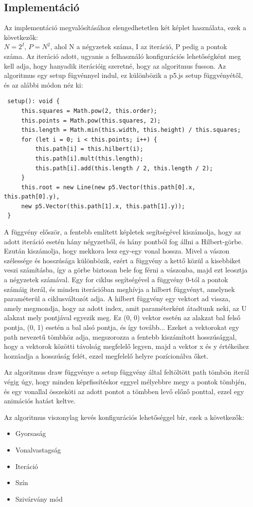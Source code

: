 \subsection*{Implementáció}
Az implementáció megvalósításához elengedhetetlen két képlet használata, ezek a következők:\\
$N = 2^I$,
$P = N^2$, ahol N a négyzetek száma, I az iteráció, P pedig a pontok száma. Az iteráció adott, ugyanis a felhasználó konfigurációs lehetőségként meg kell adja, hogy hanyadik iterációig szeretné, hogy az algoritmus fusson. 
Az algoritmus egy setup fügvénnyel indul, ez különbözik a p5.js setup függvényétől, és az alábbi módon néz ki:
\begin{lstlisting}
 setup(): void {
	 this.squares = Math.pow(2, this.order);
	 this.points = Math.pow(this.squares, 2);
	 this.length = Math.min(this.width, this.height) / this.squares;
	 for (let i = 0; i < this.points; i++) {
		 this.path[i] = this.hilbert(i);
		 this.path[i].mult(this.length);
		 this.path[i].add(this.length / 2, this.length / 2);
	 }
	 this.root = new Line(new p5.Vector(this.path[0].x, this.path[0].y),
	 new p5.Vector(this.path[1].x, this.path[1].y));
 }
\end{lstlisting}
A függvény először, a fentebb említett képletek segítségével kiszámolja, hogy az adott iteráció esetén hány négyzetből, és hány pontból fog állni a Hilbert-görbe. Ezután kiszámolja, hogy mekkora lesz egy-egy vonal hossza. Mivel a vászon szélessége és hosszúsága különbözik, ezért a függvény a kettő közül a kisebbiket veszi számításba, így a görbe biztosan bele fog férni a vászonba, majd ezt leosztja a négyzetek számával. Egy for ciklus segítségével a függvény 0-tól a pontok számáig iterál, és minden iterációban meghívja a hilbert függvényt, amelynek paraméterül a ciklusváltozót adja. A hilbert függvény egy vektort ad vissza, amely megmondja, hogy az adott index, amit paraméterként átadtunk neki, az U alakzat mely pontjával egyezik meg. Ez (0, 0) vektor esetén az alakzat bal felső pontja, (0, 1) esetén a bal alsó pontja, és így tovább... Ezeket a vektorokat egy path nevezetű tömbhöz adja, megszorozza a fentebb kiszámított hosszúsággal, hogy a vektorok közötti távolság megfelelő legyen, majd a vektor x és y értékeihez hozzáadja a hosszúság felét, ezzel megfelelő helyre pozícionálva őket.
\par Az algoritmus draw függvénye a setup függvény által feltöltött path tömbön iterál végig úgy, hogy minden képrfissítéskor eggyel mélyebbre megy a pontok tömbjén, és egy vonallal összeköti az adott pontot a tömbben levő előző ponttal, ezzel egy animációs hatást keltve. 
\par Az algoritmus viszonylag kevés konfigurációs lehetőséggel bír, ezek a következők:
\begin{itemize}
	\item Gyorsaság
	\item Vonalvastagság
	\item Iteráció
	\item Szín
	\item Szivárvány mód
\end{itemize}

